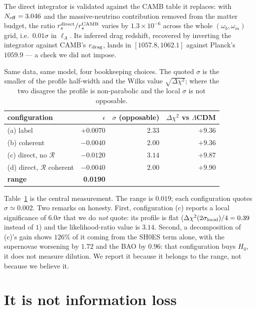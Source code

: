\documentclass[11pt,a4paper]{article}
\begin{document}
The direct integrator is validated against the CAMB table it replaces: with
$N_{\rm eff}=3.046$ and the massive-neutrino contribution removed from the matter budget,
the ratio $r_s^{\rm direct}/r_s^{\rm CAMB}$ varies by $1.3\times10^{-6}$ across the whole
$(\omega_b,\omega_m)$ grid, i.e.\ $0.01\sigma$ in $\ell_A$. Its inferred drag redshift,
recovered by inverting the integrator against CAMB's $r_{\rm drag}$, lands in
$[1057.8,1062.1]$ against Planck's $1059.9$ --- a check we did not impose.

\begin{table}[t]
\centering
\begin{tabular}{lrrr}
\toprule
configuration & $\epsilon$ & $\sigma$ (opposable) & $\Delta\chi^2$ vs $\Lambda$CDM \\
\midrule
(a) label                 & $+0.0070$ & $2.33$ & $+9.36$ \\
(b) coherent              & $-0.0040$ & $2.00$ & $+9.36$ \\
(c) direct, no $\mathcal{R}$ & $-0.0120$ & $3.14$ & $+9.87$ \\
(d) direct, $\mathcal{R}$ coherent & $-0.0040$ & $2.00$ & $+9.90$ \\
\midrule
\textbf{range} & \textbf{0.0190} & & \\
\bottomrule
\end{tabular}
\caption{Same data, same model, four bookkeeping choices. The quoted $\sigma$ is the smaller
of the profile half-width and the Wilks value $\sqrt{\Delta\chi^2}$; where the two disagree
the profile is non-parabolic and the local $\sigma$ is not opposable.}
\label{tab:quatre}
\end{table}

Table~\ref{tab:quatre} is the central measurement. The range is $0.019$; each configuration
quotes $\sigma\simeq0.002$. Two remarks on honesty. First, configuration (c) reports a local
significance of $6.0\sigma$ that we do \emph{not} quote: its profile is flat
($\Delta\chi^2(2\sigma_{\rm local})/4 = 0.39$ instead of $1$) and the likelihood-ratio value
is $3.14$. Second, a decomposition of (c)'s gain shows $126\%$ of it coming from the SH0ES
term alone, with the supernovae worsening by $1.72$ and the BAO by $0.96$: that configuration
buys $H_0$, it does not measure dilution. We report it because it belongs to the range, not
because we believe it.

\section{It is not information loss}
\label{sec:pouvoir}
\end{document}
